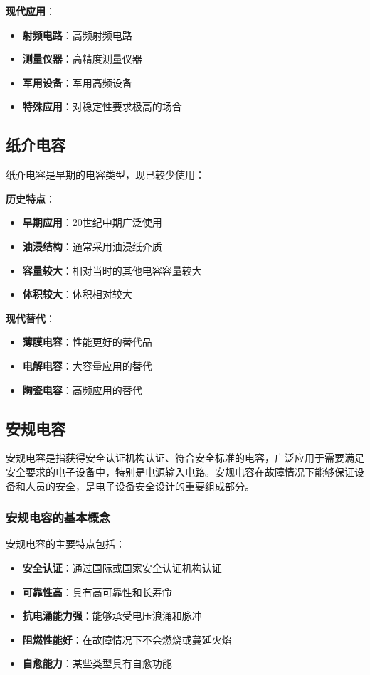 \documentclass[12pt,UTF8]{ctexbook}
\begin{document}
\textbf{现代应用}：
\begin{itemize}[leftmargin=3.5em]
    \item \textbf{射频电路}：高频射频电路
    \item \textbf{测量仪器}：高精度测量仪器
    \item \textbf{军用设备}：军用高频设备
    \item \textbf{特殊应用}：对稳定性要求极高的场合
\end{itemize}

\subsection{纸介电容}

纸介电容是早期的电容类型，现已较少使用：

\textbf{历史特点}：
\begin{itemize}[leftmargin=3.5em]
    \item \textbf{早期应用}：20世纪中期广泛使用
    \item \textbf{油浸结构}：通常采用油浸纸介质
    \item \textbf{容量较大}：相对当时的其他电容容量较大
    \item \textbf{体积较大}：体积相对较大
\end{itemize}

\textbf{现代替代}：
\begin{itemize}[leftmargin=3.5em]
    \item \textbf{薄膜电容}：性能更好的替代品
    \item \textbf{电解电容}：大容量应用的替代
    \item \textbf{陶瓷电容}：高频应用的替代
\end{itemize}

\subsection{安规电容}

安规电容是指获得安全认证机构认证、符合安全标准的电容，广泛应用于需要满足安全要求的电子设备中，特别是电源输入电路。安规电容在故障情况下能够保证设备和人员的安全，是电子设备安全设计的重要组成部分。

\subsubsection{安规电容的基本概念}

安规电容的主要特点包括：

\begin{itemize}[leftmargin=2cm]
    \item \textbf{安全认证}：通过国际或国家安全认证机构认证
    \item \textbf{可靠性高}：具有高可靠性和长寿命
    \item \textbf{抗电涌能力强}：能够承受电压浪涌和脉冲
    \item \textbf{阻燃性能好}：在故障情况下不会燃烧或蔓延火焰
    \item \textbf{自愈能力}：某些类型具有自愈功能
\end{itemize}
\end{document}
